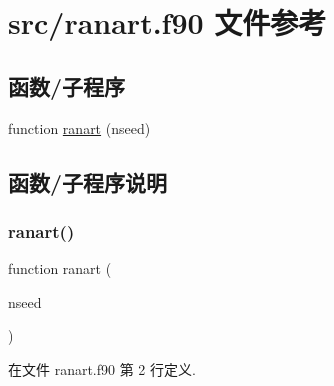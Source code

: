 \hypertarget{ranart_8f90}{}\section{src/ranart.f90 文件参考}
\label{ranart_8f90}
\subsection*{函数/子程序}
\begin{DoxyCompactItemize}
\item 
function \mbox{\hyperlink{ranart_8f90_a9ce7bb75b7ed8115c4733dd3d60caf8c}{ranart}} (nseed)
\end{DoxyCompactItemize}


\subsection{函数/子程序说明}
\mbox{\label{ranart_8f90_a9ce7bb75b7ed8115c4733dd3d60caf8c}} 
\subsubsection{\texorpdfstring{ranart()}{ranart()}}
{\footnotesize\ttfamily function ranart (\begin{DoxyParamCaption}\item[{}]{nseed }\end{DoxyParamCaption})}



在文件 ranart.\+f90 第 2 行定义.

